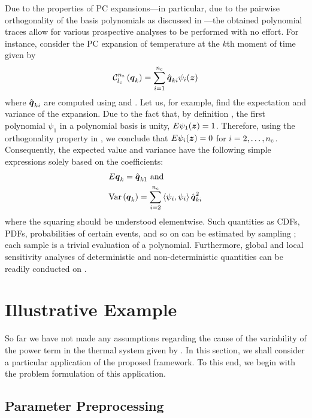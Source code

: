 Due to the properties of PC expansions---in particular, due to the pairwise
orthogonality of the basis polynomials as discussed in
---the obtained polynomial traces allow for various
prospective analyses to be performed with no effort. For instance, consider the
PC expansion of temperature at the $k$th moment of time given by
\begin{equation} \elab{pc-k}
  \chaos{\nz}{\lc}{\vq_k} = \sum_{i = 1}^{\nc} \hat{\vq}_{ki} \psi_i(\vz)
\end{equation}
where $\hat{\boldsymbol{q}}_{ki}$ are computed using  and
. Let us, for example, find the expectation and variance of
the expansion. Due to the fact that, by definition \cite{xiu2010}, the first
polynomial $\psi_1$ in a polynomial basis is unity, $\expectation{\psi_1(\vz)} =
1$. Therefore, using the orthogonality property in , we
conclude that $\expectation{\psi_i(\vz)} = 0$ for $i = 2, \dots, {n_\mathrm{c}}$.
Consequently, the expected value and variance have the following simple
expressions solely based on the coefficients:
\begin{equation} \elab{pc-moments}
  \begin{split}
    & \expectation{\vq_k} = \hat{\vq}_{k1} \text{ and} \\
    & \variance{\vq_k} = \sum_{i = 2}^{\nc} \innerproduct{\psi_i}{\psi_i} \hat{\vq}_{ki}^2
  \end{split}
\end{equation}
where the squaring should be understood elementwise. Such quantities as CDFs,
PDFs, probabilities of certain events, and so on can be estimated by sampling
; each sample is a trivial evaluation of a polynomial. Furthermore,
global and local sensitivity analyses of deterministic and non-deterministic
quantities can be readily conducted on .

\section{Illustrative Example}

So far we have not made any assumptions regarding the cause of the variability
of the power term in the thermal system given by . In this
section, we shall consider a particular application of the proposed framework.
To this end, we begin with the problem formulation of this application.

\subsection{Parameter Preprocessing}

